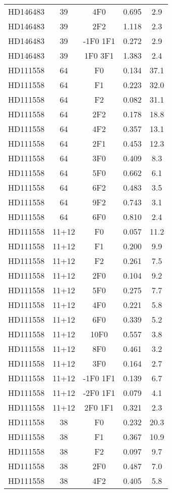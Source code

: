 \begin{table*}
\begin{tabular}{l c c c c}
HD146483 & 39 & 4F0 & 0.695 & 2.9\\ 
HD146483 & 39 & 2F2 & 1.118 & 2.3\\ 
HD146483 & 39 & -1F0 1F1 & 0.272 & 2.9\\ 
HD146483 & 39 & 1F0 3F1 & 1.383 & 2.4\\ 
\hline
HD111558 & 64 & F0 & 0.134 & 37.1\\ 
HD111558 & 64 & F1 & 0.223 & 32.0\\ 
HD111558 & 64 & F2 & 0.082 & 31.1\\ 
HD111558 & 64 & 2F2 & 0.178 & 18.8\\ 
HD111558 & 64 & 4F2 & 0.357 & 13.1\\ 
HD111558 & 64 & 2F1 & 0.453 & 12.3\\ 
HD111558 & 64 & 3F0 & 0.409 & 8.3\\ 
HD111558 & 64 & 5F0 & 0.662 & 6.1\\ 
HD111558 & 64 & 6F2 & 0.483 & 3.5\\ 
HD111558 & 64 & 9F2 & 0.743 & 3.1\\ 
HD111558 & 64 & 6F0 & 0.810 & 2.4\\ 
\hline
HD111558 & 11+12 & F0 & 0.057 & 11.2\\ 
HD111558 & 11+12 & F1 & 0.200 & 9.9\\ 
HD111558 & 11+12 & F2 & 0.261 & 7.5\\ 
HD111558 & 11+12 & 2F0 & 0.104 & 9.2\\ 
HD111558 & 11+12 & 5F0 & 0.275 & 7.7\\ 
HD111558 & 11+12 & 4F0 & 0.221 & 5.8\\ 
HD111558 & 11+12 & 6F0 & 0.339 & 5.2\\ 
HD111558 & 11+12 & 10F0 & 0.557 & 3.8\\ 
HD111558 & 11+12 & 8F0 & 0.461 & 3.2\\ 
HD111558 & 11+12 & 3F0 & 0.164 & 2.7\\ 
HD111558 & 11+12 & -1F0 1F1 & 0.139 & 6.7\\ 
HD111558 & 11+12 & -2F0 1F1 & 0.079 & 4.1\\ 
HD111558 & 11+12 & 2F0 1F1 & 0.321 & 2.3\\ 
\hline
HD111558 & 38 & F0 & 0.232 & 20.3\\ 
HD111558 & 38 & F1 & 0.367 & 10.9\\ 
HD111558 & 38 & F2 & 0.097 & 9.7\\ 
HD111558 & 38 & 2F0 & 0.487 & 7.0\\ 
HD111558 & 38 & 4F2 & 0.405 & 5.8\\ 

\end{tabular}
\end{table*}
